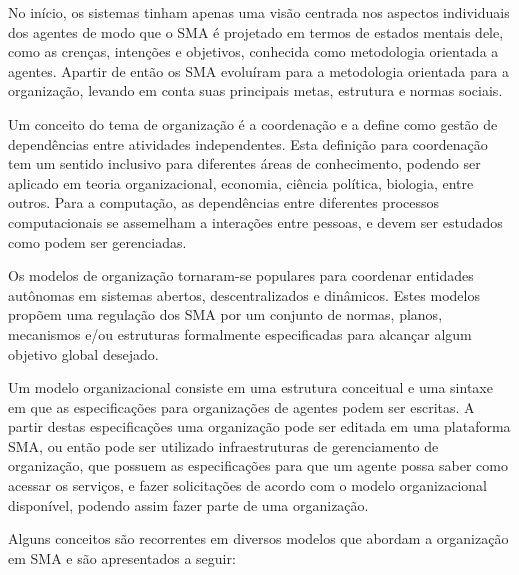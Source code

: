 No início, os sistemas tinham apenas uma visão centrada nos aspectos individuais dos agentes de modo que o SMA é projetado em termos de estados mentais dele, como as crenças, intenções e objetivos, conhecida como metodologia orientada a agentes. Apartir de então os SMA evoluíram para a metodologia orientada para a organização, levando em conta suas principais metas, estrutura e normas sociais\cite{argente2006multi}. 

Um conceito do tema de organização é a coordenação e \citet{malone1994interdisciplinary} a define como gestão de dependências entre atividades independentes. Esta definição para coordenação tem um sentido inclusivo para diferentes áreas de conhecimento, podendo ser aplicado em teoria organizacional, economia, ciência política, biologia, entre outros. Para a computação, as dependências entre diferentes processos computacionais se assemelham a interações entre pessoas, e devem ser estudados como podem ser gerenciadas.



Os modelos de organização tornaram-se populares para coordenar entidades autônomas em sistemas abertos, descentralizados e dinâmicos. Estes modelos propõem uma regulação dos SMA por um conjunto de normas, planos, mecanismos e/ou estruturas formalmente especificadas para alcançar algum objetivo global desejado.

Um modelo organizacional consiste em uma estrutura conceitual e uma sintaxe em que as especificações para organizações de agentes podem ser escritas. A partir destas especificações uma organização pode ser editada em uma plataforma SMA, ou então pode ser utilizado infraestruturas de gerenciamento de organização, que possuem as especificações para que um agente possa saber como acessar os serviços, e fazer solicitações de acordo com o modelo organizacional disponível, podendo assim fazer parte de uma organização.


Alguns conceitos são recorrentes em diversos modelos que abordam a organização em SMA e são apresentados a seguir:

